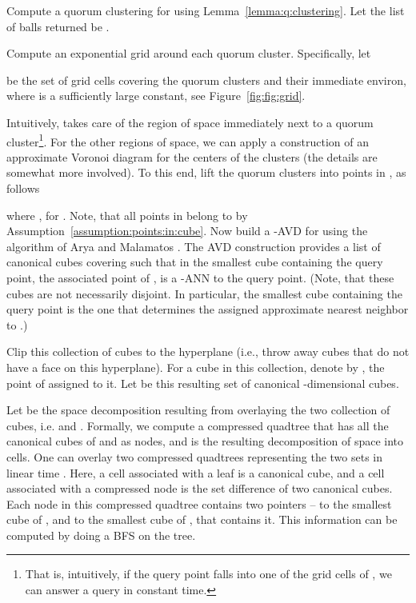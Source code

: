 \documentclass[12pt]{article}
\makeatletter
\newcommand{\assumpref}[1]{Assumption~\ref{assumption:#1}}
\providecommand{\lemref}[1]{Lemma~\ref{lemma:#1}}
\newcommand{\figref}[1]{Figure~\ref{fig:#1}}
\newcommand{\Term}[1]{\textsf{#1}}
\newcommand{\TermI}[1]{\Term{#1}\index{#1@\Term{#1}}}
\newcommand{\BFS}{\textsf{BFS}\xspace}
\theoremstyle{remark}{\theorembodyfont{\rm} \newtheorem{remark}[theorem]{Remark}}
\newcommand{\ANN}{\TermI{ANN}\xspace}
\newcommand{\AVD}{\TermI{AVD}\xspace}
\newlength{\savedparindent}
\newcommand{\SaveIndent}{\setlength{\savedparindent}{\parindent}}
\newcommand{\RestoreIndent}{\setlength{\parindent}{\savedparindent}}
\makeatother
\begin{document}
\SaveIndent
\begin{compactenum}[(A)]
    \RestoreIndent
    \item Compute a quorum clustering for  using
    \lemref{q:clustering}. Let the list of balls returned be .
    
    \item Compute an exponential grid around each quorum
    cluster. Specifically, let
    
    be the set of grid cells covering the quorum clusters and their
    immediate environ, where  is a sufficiently large
    constant, see \figref{fig:grid}.
    
\item Intuitively,  takes care of the region of space
    immediately next to a quorum cluster\footnote{That is, intuitively, if the query point falls into one
       of the grid cells of , we can answer a query in
       constant time.}.  For the other regions of space, we can apply
    a construction of an approximate Voronoi diagram for
    the centers of the clusters (the details are somewhat more
    involved). To this end, lift the quorum clusters into points in
    , as follows
    
    where ,
    for .  Note, that all points in
     belong to  by
    \assumpref{points:in:cube}.  Now build a -\AVD for
     using the algorithm of Arya and Malamatos
    \cite{am-lsavd-02}. The \AVD construction provides a list of
    canonical cubes covering  such that in the smallest
    cube containing the query point, the associated point of
    , is a -\ANN to the query
    point. (Note, that these cubes are not necessarily disjoint. In
    particular, the smallest cube containing the query point 
    is the one that determines the assigned approximate nearest
    neighbor to .)
    
    
    Clip this collection of cubes to the hyperplane 
    (i.e., throw away cubes that do not have a face on this
    hyperplane). For a cube  in this collection, denote by
    , the point of  assigned to it.
    Let  be this resulting set of canonical -dimensional
    cubes.
    
    
    \item Let  be the space decomposition resulting from
    overlaying the two collection of cubes, i.e.  and
    .  Formally, we compute a compressed quadtree 
    that has all the canonical cubes of  and  as
    nodes, and  is the resulting decomposition of space
    into cells. One can overlay two compressed quadtrees representing
    the two sets in linear time \cite{bhst-sqgqi-10, h-gaa-11}.  Here,
    a cell associated with a leaf is a canonical cube, and a cell
    associated with a compressed node is the set difference of two
    canonical cubes. Each node in this compressed quadtree contains
    two pointers -- to the smallest cube of , and 
    to the smallest cube of , that contains it. This
    information can be computed by doing a \BFS on the tree.
    

\end{compactenum}
\end{document}
